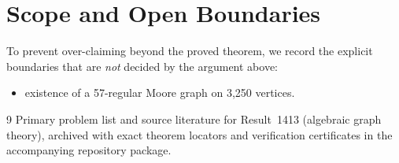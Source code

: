 \documentclass[10pt,reqno]{amsart}
\theoremstyle{definition}
\begin{document}
\section{Scope and Open Boundaries}

To prevent over-claiming beyond the proved theorem, we record the explicit boundaries that are \emph{not} decided by the argument above:
\begin{itemize}
  \item existence of a 57-regular Moore graph on 3,250 vertices.
\end{itemize}

\begin{thebibliography}{9}
Primary problem list and source literature for Result~1413 (algebraic graph theory), archived with exact theorem locators and verification certificates in the accompanying repository package.
\end{thebibliography}
\end{document}
